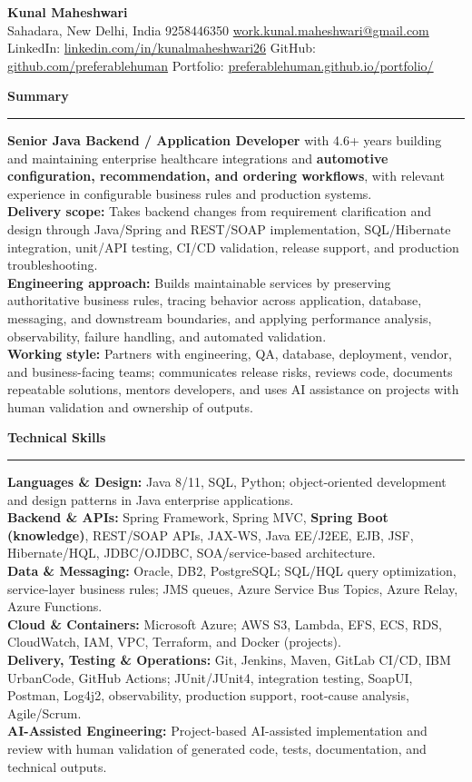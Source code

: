 \documentclass[11pt,letterpaper]{article}
\newcommand{\ressection}[1]{\Needspace{6\baselineskip}\vspace{8pt}\par\textbf{#1}\par\vspace{2pt}\hrule\vspace{5pt}}
\begin{document}
\pagestyle{empty}\raggedright\fontsize{11}{12.5}\selectfont

{\Large \textbf{Kunal Maheshwari}}\\
Sahadara, New Delhi, India \textbar{} 9258446350 \textbar{} \href{mailto:work.kunal.maheshwari@gmail.com}{work.kunal.maheshwari@gmail.com}\\
LinkedIn: \href{https://www.linkedin.com/in/kunalmaheshwari26}{linkedin.com/in/kunalmaheshwari26} \textbar{} GitHub: \href{https://github.com/preferablehuman}{github.com/preferablehuman} \textbar{} Portfolio: \href{https://preferablehuman.github.io/portfolio/}{preferablehuman.github.io/portfolio/}

\ressection{Summary}
\textbf{Senior Java Backend / Application Developer} with 4.6+ years building and maintaining enterprise healthcare integrations and \textbf{automotive configuration, recommendation, and ordering workflows}, with relevant experience in configurable business rules and production systems.\\[2pt]
\textbf{Delivery scope:} Takes backend changes from requirement clarification and design through Java/Spring and REST/SOAP implementation, SQL/Hibernate integration, unit/API testing, CI/CD validation, release support, and production troubleshooting.\\[2pt]
\textbf{Engineering approach:} Builds maintainable services by preserving authoritative business rules, tracing behavior across application, database, messaging, and downstream boundaries, and applying performance analysis, observability, failure handling, and automated validation.\\[2pt]
\textbf{Working style:} Partners with engineering, QA, database, deployment, vendor, and business-facing teams; communicates release risks, reviews code, documents repeatable solutions, mentors developers, and uses AI assistance on projects with human validation and ownership of outputs.

\ressection{Technical Skills}
\textbf{Languages \& Design:} Java 8/11, SQL, Python; object-oriented development and design patterns in Java enterprise applications.\\
\textbf{Backend \& APIs:} Spring Framework, Spring MVC, \textbf{Spring Boot (knowledge)}, REST/SOAP APIs, JAX-WS, Java EE/J2EE, EJB, JSF, Hibernate/HQL, JDBC/OJDBC, SOA/service-based architecture.\\
\textbf{Data \& Messaging:} Oracle, DB2, PostgreSQL; SQL/HQL query optimization, service-layer business rules; JMS queues, Azure Service Bus Topics, Azure Relay, Azure Functions.\\
\textbf{Cloud \& Containers:} Microsoft Azure; AWS S3, Lambda, EFS, ECS, RDS, CloudWatch, IAM, VPC, Terraform, and Docker (projects).\\
\textbf{Delivery, Testing \& Operations:} Git, Jenkins, Maven, GitLab CI/CD, IBM UrbanCode, GitHub Actions; JUnit/JUnit4, integration testing, SoapUI, Postman, Log4j2, observability, production support, root-cause analysis, Agile/Scrum.\\
\textbf{AI-Assisted Engineering:} Project-based AI-assisted implementation and review with human validation of generated code, tests, documentation, and technical outputs.
\end{document}

